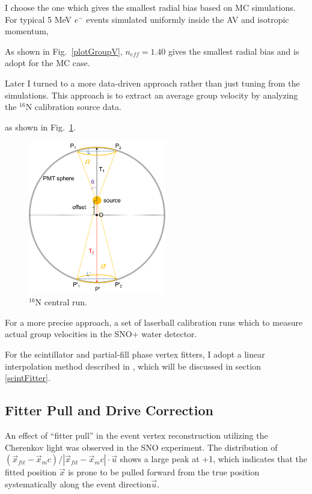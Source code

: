 I choose the one which gives the smallest radial bias based on MC simulations. 
For typical 5 MeV $e^-$ events simulated uniformly inside the AV and isotropic momentum,  

As shown in Fig.~\ref{plotGroupV}, $n_{eff}=1.40$ gives the smallest radial bias and is adopt for the MC case.


Later I turned to a more data-driven approach rather than just tuning from the simulations. This approach is to extract an average group velocity by analyzing the $^{16}$N calibration source data.

as shown in Fig.~\ref{n16_groupVeloctiy}.

\begin{figure}[!htb]
	\centering
	\includegraphics[width=6cm]{n16_groupVelocity.png}
	\caption{$^{16}$N central run.}
	\label{n16_groupVeloctiy}
\end{figure}

For a more precise approach, a set of laserball calibration runs which  to measure actual group velocities in the SNO+ water detector\cite{groupVmeasure}. 
 
For the scintillator and partial-fill phase vertex fitters, I adopt a linear interpolation method described in \cite{coulter2013modelling}, which will be discussed in section \ref{scintFitter}.

\subsection{Fitter Pull and Drive Correction}

An effect of ``fitter pull'' in the event vertex reconstruction utilizing the Cherenkov light was observed in the SNO experiment. The distribution of $(\vec{x}_{fit}-\vec{x}_mc)/|\vec{x}_{fit}-\vec{x}_mc|\cdot \vec{u}$ shows a large peak at +1, which indicates that the fitted position $\vec{x}$ is prone to be pulled forward from the true position systematically along the event direction$\vec{u}$\cite{driveCorPeter,brice1996monte,coulter2013modelling}. 

